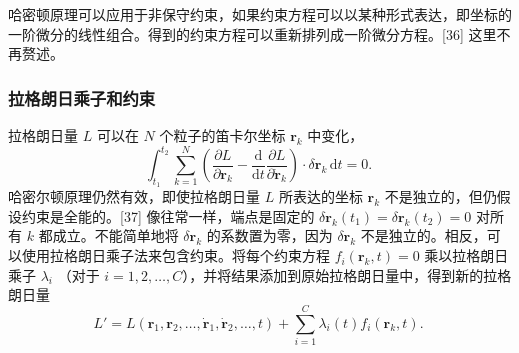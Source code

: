 哈密顿原理可以应用于非保守约束，如果约束方程可以以某种形式表达，即坐标的一阶微分的线性组合。得到的约束方程可以重新排列成一阶微分方程。[36] 这里不再赘述。
\subsubsection{拉格朗日乘子和约束}

拉格朗日量 \( L \) 可以在 \( N \) 个粒子的笛卡尔坐标 \( \mathbf{r}_k \) 中变化，
\[
\int_{t_{1}}^{t_{2}} \sum_{k=1}^{N} \left( \frac{\partial L}{\partial \mathbf{r}_{k}} - \frac{\mathrm{d}}{\mathrm{d} t} \frac{\partial L}{\partial \dot{\mathbf{r}}_{k}} \right) \cdot \delta \mathbf{r}_{k} \,\mathrm{d} t = 0.~
\]
哈密尔顿原理仍然有效，即使拉格朗日量 \( L \) 所表达的坐标 \( \mathbf{r}_k \) 不是独立的，但仍假设约束是全能的。[37] 像往常一样，端点是固定的 \( \delta \mathbf{r}_k(t_1) = \delta \mathbf{r}_k(t_2) = 0 \) 对所有 \( k \) 都成立。不能简单地将 \( \delta \mathbf{r}_k \) 的系数置为零，因为 \( \delta \mathbf{r}_k \) 不是独立的。相反，可以使用拉格朗日乘子法来包含约束。将每个约束方程 \( f_i(\mathbf{r}_k, t) = 0 \) 乘以拉格朗日乘子 \( \lambda_i \) （对于 \( i = 1, 2, \ldots, C \)），并将结果添加到原始拉格朗日量中，得到新的拉格朗日量
\[
L' = L(\mathbf{r}_{1}, \mathbf{r}_{2}, \ldots, \dot{\mathbf{r}}_{1}, \dot{\mathbf{r}}_{2}, \ldots, t) + \sum_{i=1}^{C} \lambda_{i}(t) f_{i}(\mathbf{r}_{k}, t).~
\]

